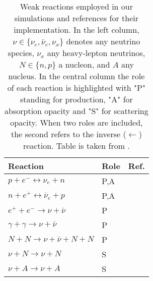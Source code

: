 \begin{table}
    \caption{
        Weak reactions employed in our simulations and references for their implementation.
        In the left column, $\nu \in \{\nu_e, \bar{\nu}_e, \nu_{x}\}$ denotes any neutrino species, 
        $\nu_{x}$ any heavy-lepton neutrinos, $N \in\{n, p\}$ a nucleon, and $A$ any nucleus.
        In the central column the role of each reaction is highlighted with "P" standing for 
        production, "A" for absorption opacity and "S" for scattering opacity.
        When two roles are included, the second refers to the inverse ($\leftarrow$) reaction.
        Table is taken from \citet{Radice:2018pdn}.
    }
    \label{tab:leakage}
    \begin{center}
        \begin{tabular}{l l l}
            \hline\hline
            Reaction & Role &  Ref. \\ 
            \hline
            $p + e^- \leftrightarrow \nu_e + n $          & P,A & \citep{Bruenn:1985}  \\
            $n + e^+ \leftrightarrow \bar{\nu}_{e} + p $  & P,A & \citep{Bruenn:1985}  \\
            $e^+ + e^- \rightarrow \nu + \bar{\nu}$       & P   & \citep{Ruffert:1995fs} \\
            $\gamma + \gamma \rightarrow \nu + \bar{\nu}$ & P   & \citep{Ruffert:1995fs} \\
            $N + N \rightarrow \nu + \bar{\nu} + N  + N$  & P   & \citep{Burrows:2004vq} \\
            $\nu + N \rightarrow \nu + N$                 & S   & \citep{Ruffert:1995fs} \\
            $\nu + A \rightarrow \nu + A$                 & S   & \citep{Shapiro:1983du} \\
            \hline\hline
        \end{tabular}
    \end{center}
\end{table}


